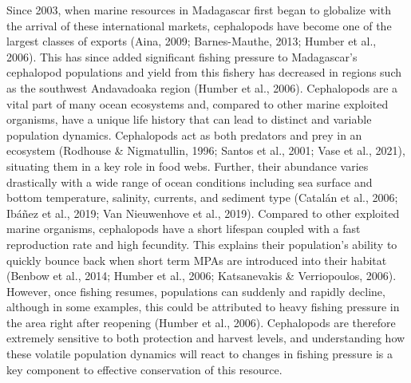 \documentclass[
]{article}
\begin{document}
Since 2003, when marine resources in Madagascar first began to globalize with the arrival of these international markets, cephalopods have become one of the largest classes of exports (Aina, 2009; Barnes-Mauthe, 2013; Humber et al., 2006). This has since added significant fishing pressure to Madagascar's cephalopod populations and yield from this fishery has decreased in regions such as the southwest Andavadoaka region (Humber et al., 2006). Cephalopods are a vital part of many ocean ecosystems and, compared to other marine exploited organisms, have a unique life history that can lead to distinct and variable population dynamics. Cephalopods act as both predators and prey in an ecosystem (Rodhouse \& Nigmatullin, 1996; Santos et al., 2001; Vase et al., 2021), situating them in a key role in food webs. Further, their abundance varies drastically with a wide range of ocean conditions including sea surface and bottom temperature, salinity, currents, and sediment type (Catalán et al., 2006; Ibáñez et al., 2019; Van Nieuwenhove et al., 2019). Compared to other exploited marine organisms, cephalopods have a short lifespan coupled with a fast reproduction rate and high fecundity. This explains their population's ability to quickly bounce back when short term MPAs are introduced into their habitat (Benbow et al., 2014; Humber et al., 2006; Katsanevakis \& Verriopoulos, 2006). However, once fishing resumes, populations can suddenly and rapidly decline, although in some examples, this could be attributed to heavy fishing pressure in the area right after reopening (Humber et al., 2006). Cephalopods are therefore extremely sensitive to both protection and harvest levels, and understanding how these volatile population dynamics will react to changes in fishing pressure is a key component to effective conservation of this resource.
\end{document}
